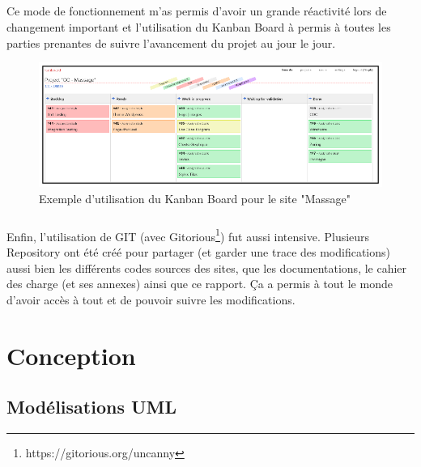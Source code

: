 \documentclass[11pt,a4paper]{report}
\begin{document}
			\paragraph*{}Ce mode de fonctionnement m'as permis d'avoir un grande réactivité lors de changement important et l'utilisation du Kanban Board à permis à toutes les parties prenantes de suivre l'avancement du projet au jour le jour.
			\begin{figure}[H]
				\centering
				\includegraphics[width=\textwidth]{kanban.eps}
				\caption[Kanban Board]{Exemple d'utilisation du Kanban Board pour le site "Massage"}
				\label{fig:Kanban-Board}
			\end{figure}
			\paragraph*{}Enfin, l'utilisation de GIT (avec Gitorious\footnote{https://gitorious.org/uncanny}) fut aussi intensive. Plusieurs Repository ont été créé pour partager (et garder une trace des modifications) aussi bien les différents codes sources des sites, que les documentations, le cahier des charge (et ses annexes) ainsi que ce rapport. Ça a permis à tout le monde d'avoir accès à tout et de pouvoir suivre les modifications.
			

\chapter{Conception}
	\section{Modélisations UML}
\end{document}
